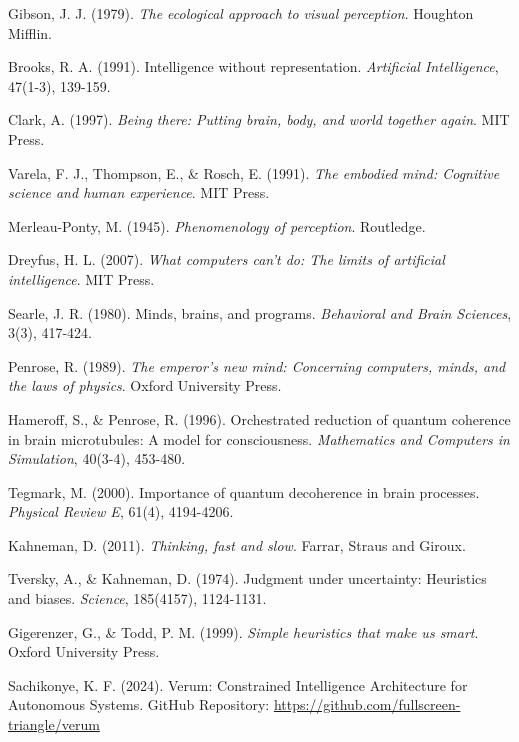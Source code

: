 \documentclass[12pt,a4paper]{article}
\begin{document}
\begin{thebibliography}{99}
Gibson, J. J. (1979). \textit{The ecological approach to visual perception}. Houghton Mifflin.

Brooks, R. A. (1991). Intelligence without representation. \textit{Artificial Intelligence}, 47(1-3), 139-159.

Clark, A. (1997). \textit{Being there: Putting brain, body, and world together again}. MIT Press.

Varela, F. J., Thompson, E., \& Rosch, E. (1991). \textit{The embodied mind: Cognitive science and human experience}. MIT Press.

Merleau-Ponty, M. (1945). \textit{Phenomenology of perception}. Routledge.

Dreyfus, H. L. (2007). \textit{What computers can't do: The limits of artificial intelligence}. MIT Press.

Searle, J. R. (1980). Minds, brains, and programs. \textit{Behavioral and Brain Sciences}, 3(3), 417-424.

Penrose, R. (1989). \textit{The emperor's new mind: Concerning computers, minds, and the laws of physics}. Oxford University Press.

Hameroff, S., \& Penrose, R. (1996). Orchestrated reduction of quantum coherence in brain microtubules: A model for consciousness. \textit{Mathematics and Computers in Simulation}, 40(3-4), 453-480.

Tegmark, M. (2000). Importance of quantum decoherence in brain processes. \textit{Physical Review E}, 61(4), 4194-4206.

Kahneman, D. (2011). \textit{Thinking, fast and slow}. Farrar, Straus and Giroux.

Tversky, A., \& Kahneman, D. (1974). Judgment under uncertainty: Heuristics and biases. \textit{Science}, 185(4157), 1124-1131.

Gigerenzer, G., \& Todd, P. M. (1999). \textit{Simple heuristics that make us smart}. Oxford University Press.

Sachikonye, K. F. (2024). Verum: Constrained Intelligence Architecture for Autonomous Systems. GitHub Repository: \url{https://github.com/fullscreen-triangle/verum}

\end{thebibliography}
\end{document}
